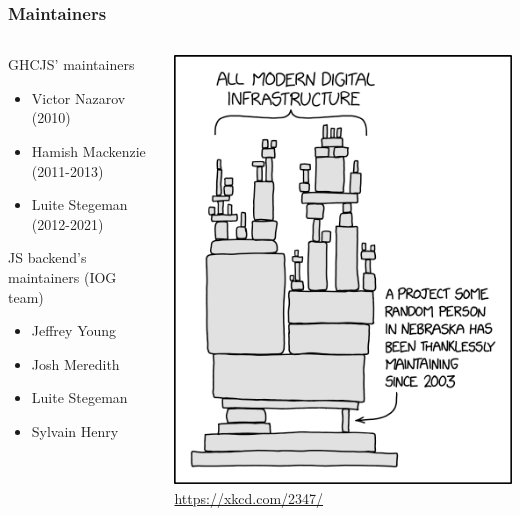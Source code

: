 \documentclass{beamer}
\begin{document}
\begin{frame}
\frametitle{Maintainers}
\begin{columns}

\begin{column}{0.6\textwidth}
GHCJS’ maintainers
\begin{itemize}
\item Victor Nazarov (2010)
\item Hamish Mackenzie (2011-2013)
\item Luite Stegeman (2012-2021)
\end{itemize}

JS backend’s maintainers (IOG team)
\begin{itemize}
\item Jeffrey Young
\item Josh Meredith
\item Luite Stegeman
\item Sylvain Henry
\end{itemize}
\end{column}

\begin{column}{0.4\textwidth}
\begin{center}
\includegraphics[scale=0.3]{images/xkcd_2347.png}
\tiny\url{https://xkcd.com/2347/}
\end{center}
\end{column}

\end{columns}

\end{frame}
\end{document}
